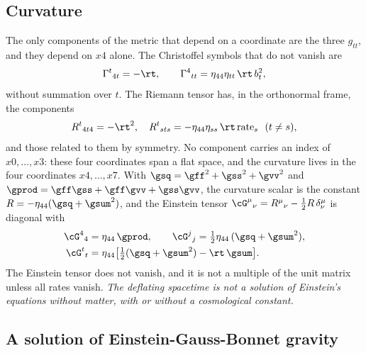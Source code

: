 \subsection{Curvature}
\label{sec:curvature}

The only components of the metric that depend on a coordinate are the three $g_{tt}$, and they depend
on $x4$ alone. The Christoffel symbols that do not vanish are
\begin{equation}
\Gamma^{t}{}_{4t}=-\rt,\qquad\Gamma^{4}{}_{tt}=\eta_{44}\eta_{tt}\,\rt\,b_t^{2},
\end{equation}
without summation over $t$. The Riemann tensor has, in the orthonormal frame, the components
\begin{equation}
R^{t}{}_{4t4}=-\rt^{2},\quad R^{t}{}_{sts}=-\eta_{44}\eta_{ss}\,\rt\,\mathrm{rate}_s\ \ (t\ne s),
\label{eq:riemann}
\end{equation}
and those related to them by symmetry. No component carries an index of $x0,\dots,x3$: these four
coordinates span a flat space, and the curvature lives in the four coordinates $x4,\dots,x7$. With
$\gsq=\gff^2+\gss^2+\gvv^2$ and $\gprod=\gff\gss+\gff\gvv+\gss\gvv$, the curvature scalar is the
constant $R=-\eta_{44}(\gsq+\gsum^{2})$, and the Einstein tensor
$\cG^{\mu}{}_{\nu}=R^{\mu}{}_{\nu}-\tfrac12R\,\delta^{\mu}_{\nu}$ is diagonal with
\begin{equation}
\begin{aligned}
\cG^{4}{}_{4}&=\eta_{44}\,\gprod,\qquad\cG^{j}{}_{j}=\tfrac12\eta_{44}\,(\gsq+\gsum^{2}),\\
\cG^{t}{}_{t}&=\eta_{44}\big[\tfrac12(\gsq+\gsum^{2})-\rt\,\gsum\big].
\end{aligned}
\label{eq:einstein}
\end{equation}
The Einstein tensor does not vanish, and it is not a multiple of the unit matrix unless all rates
vanish. \emph{The deflating spacetime is not a solution of Einstein's equations without matter, with
or without a cosmological constant.}

\subsection{A solution of Einstein-Gauss-Bonnet gravity}
\label{sec:egb}

